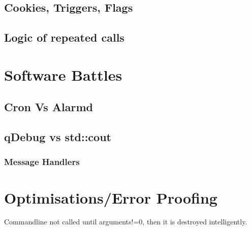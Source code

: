 \documentclass[11pt]{article} %
\begin{document}
\subsection{Cookies, Triggers, Flags}
\subsection{Logic of repeated calls}
\section{Software Battles}
\subsection{Cron Vs Alarmd}
\subsection{qDebug vs std::cout}
\subsubsection{Message Handlers}
\section{Optimisations/Error Proofing}
Commandline not called until arguments!=0, then it is destroyed intelligently.
\end{document}

